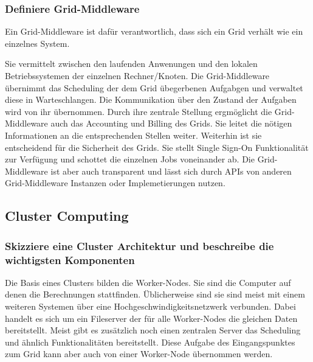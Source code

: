\subsubsection{Definiere Grid-Middleware}
	Ein Grid-Middleware ist daf\"ur verantwortlich,
	dass sich ein Grid verh\"alt wie ein einzelnes System.
	
	Sie vermittelt zwischen den laufenden Anwenungen und den lokalen
	Betriebssystemen der einzelnen Rechner/Knoten.
	Die Grid-Middleware \"ubernimmt das Scheduling der dem Grid \"ubegerbenen
	Aufgabgen und verwaltet diese in Warteschlangen.
	Die Kommunikation \"uber den Zustand der Aufgaben wird von ihr \"ubernommen.
	Durch ihre zentrale Stellung ergm\"oglicht die Grid-Middleware auch
	das Accounting und Billing des Grids.
	Sie leitet die n\"otigen Informationen an die entsprechenden Stellen weiter.
	Weiterhin ist sie entscheidend f\"ur die Sicherheit des Grids.
	Sie stellt Single Sign-On Funktionalit\"at zur Verf\"ugung und
	schottet die einzelnen Jobs voneinander ab.
	Die Grid-Middleware ist aber auch transparent und l\"asst sich durch APIs
	von anderen Grid-Middleware Instanzen oder Implemetierungen nutzen.

\subsection{Cluster Computing}
	\subsubsection{Skizziere eine Cluster Architektur und beschreibe die wichtigsten Komponenten}

	Die Basis eines Clusters bilden die Worker-Nodes.
	Sie sind die Computer auf denen die Berechnungen stattfinden.
	\"Ublicherweise sind sie sind meist mit einem weiteren Systemen \"uber
	eine Hochgeschwindigkeitsnetzwerk verbunden.
	Dabei handelt es sich um ein Fileserver der f\"ur alle Worker-Nodes
	die gleichen Daten bereitstellt.
	Meist gibt es zus\"atzlich noch einen zentralen Server das Scheduling und ähnlich Funktionalit\"aten
	bereitstellt.
	Diese Aufgabe des Eingangspunktes zum Grid kann aber auch von einer Worker-Node \"ubernommen werden.

